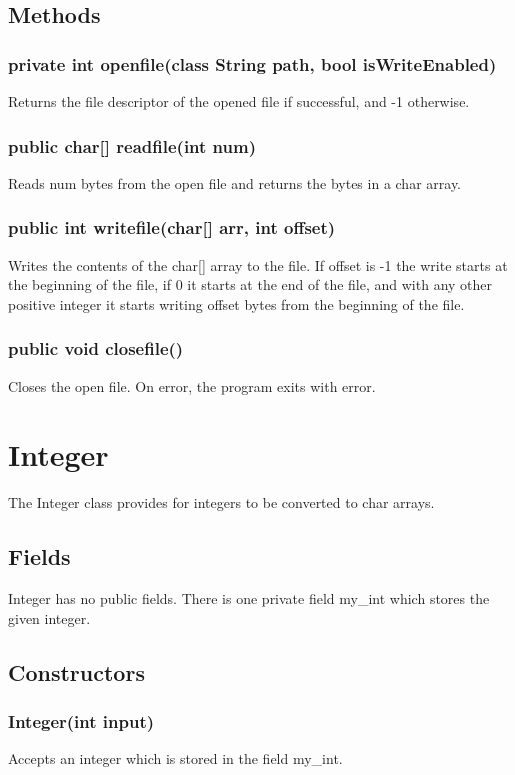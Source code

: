 \begin{homeworkProblem}
	\subsection{Methods}
    \subsubsection{private int openfile(class String path, bool isWriteEnabled)}
    Returns the file descriptor of the opened file if successful, and -1 otherwise. 
	\subsubsection{public char[] readfile(int num)}
	Reads num bytes from the open file and returns the bytes in a char array.
	\subsubsection{public int writefile(char[] arr, int offset)}
	Writes the contents of the char[] array to the file. If offset is -1 the write starts at the beginning of the file, if 0 it starts at the end of the file, and with any other positive integer it starts writing offset bytes from the beginning of the file.
	\subsubsection{public void closefile()}
	Closes the open file. On error, the program exits with error.

    \section{Integer}
    The Integer class provides for integers to be converted to char arrays.
    \subsection{Fields}
    Integer has no public fields. There is one private field my\_int which stores the given integer.

    \subsection{Constructors}
    \subsubsection{Integer(int input)}
    Accepts an integer which is stored in the field my\_int.


\end{homeworkProblem}
